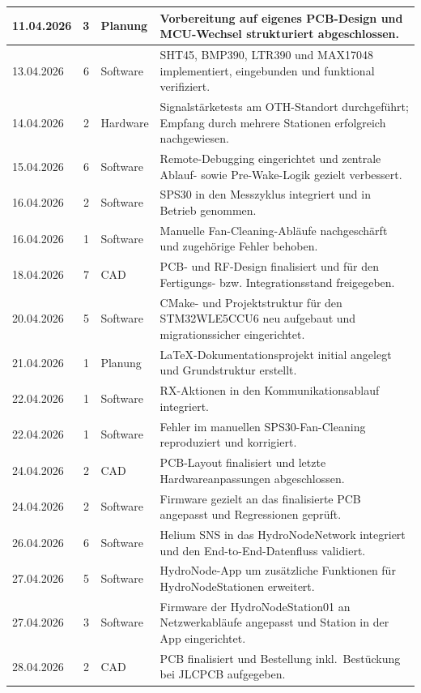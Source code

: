\begin{longtable}{|l|c|l|p{7.5cm}|}
\hline
11.04.2026 & 3 & Planung & Vorbereitung auf eigenes PCB-Design und MCU-Wechsel strukturiert abgeschlossen. \\
\hline
13.04.2026 & 6 & Software & SHT45, BMP390, LTR390 und MAX17048 implementiert, eingebunden und funktional verifiziert. \\
\hline
14.04.2026 & 2 & Hardware & Signalstärketests am OTH-Standort durchgeführt; Empfang durch mehrere Stationen erfolgreich nachgewiesen. \\
\hline
15.04.2026 & 6 & Software & Remote-Debugging eingerichtet und zentrale Ablauf- sowie Pre-Wake-Logik gezielt verbessert. \\
\hline
16.04.2026 & 2 & Software & SPS30 in den Messzyklus integriert und in Betrieb genommen. \\
\hline
16.04.2026 & 1 & Software & Manuelle Fan-Cleaning-Abläufe nachgeschärft und zugehörige Fehler behoben. \\
\hline
18.04.2026 & 7 & CAD & PCB- und RF-Design finalisiert und für den Fertigungs- bzw. Integrationsstand freigegeben. \\
\hline
20.04.2026 & 5 & Software & CMake- und Projektstruktur für den STM32WLE5CCU6 neu aufgebaut und migrationssicher eingerichtet. \\
\hline
21.04.2026 & 1 & Planung & LaTeX-Dokumentationsprojekt initial angelegt und Grundstruktur erstellt. \\
\hline
22.04.2026 & 1 & Software & RX-Aktionen in den Kommunikationsablauf integriert. \\
\hline
22.04.2026 & 1 & Software & Fehler im manuellen SPS30-Fan-Cleaning reproduziert und korrigiert. \\
\hline
24.04.2026 & 2 & CAD & PCB-Layout finalisiert und letzte Hardwareanpassungen abgeschlossen. \\
\hline
24.04.2026 & 2 & Software & Firmware gezielt an das finalisierte PCB angepasst und Regressionen geprüft. \\
\hline
26.04.2026 & 6 & Software & Helium SNS in das HydroNodeNetwork integriert und den End-to-End-Datenfluss validiert. \\
\hline
27.04.2026 & 5 & Software & HydroNode-App um zusätzliche Funktionen für HydroNodeStationen erweitert. \\
\hline
27.04.2026 & 3 & Software & Firmware der HydroNodeStation01 an Netzwerkabläufe angepasst und Station in der App eingerichtet. \\
\hline
28.04.2026 & 2 & CAD & PCB finalisiert und Bestellung inkl.\ Bestückung bei JLCPCB aufgegeben. \\

\end{longtable}

